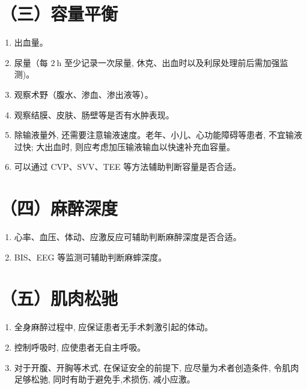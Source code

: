 \documentclass[10pt]{article}
\begin{document}
\section*{（三）容量平衡}
\begin{enumerate}
  \item 出血量。

  \item 尿量（每 $2 \mathrm{~h}$ 至少记录一次尿量, 休克、出血时以及利尿处理前后需加强监测)。

  \item 观察术野（腹水、渗血、渗出液等）。

  \item 观察结膜、皮肤、肠壁等是否有水肿表现。

  \item 除输液量外, 还需要注意输液速度。老年、小儿、心功能障碍等患者, 不宜输液过快; 大出血时, 则应考虑加压输液输血以快速补充血容量。

  \item 可以通过 CVP、SVV、TEE 等方法辅助判断容量是否合适。

\end{enumerate}

\section*{（四）麻醉深度}
\begin{enumerate}
  \item 心率、血压、体动、应激反应可辅助判断麻醉深度是否合适。

  \item BIS、EEG 等监测可辅助判断麻蟀深度。

\end{enumerate}

\section*{（五）肌肉松驰}
\begin{enumerate}
  \item 全身麻醉过程中, 应保证患者无手术刺激引起的体动。

  \item 控制呼吸时, 应使患者无自主呼吸。

  \item 对于开腹、开胸等术式, 在保证安全的前提下, 应尽量为术者创造条件, 令肌肉足够松驰, 同时有助于避免手,术损伤, 减小应激。

\end{enumerate}
\end{document}
